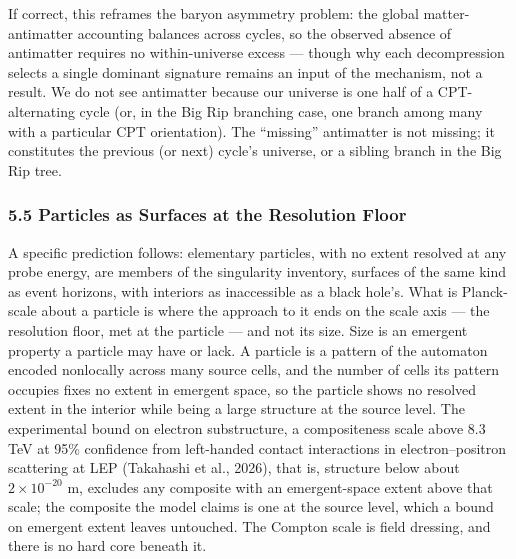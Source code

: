\documentclass[
]{article}
\begin{document}
If correct, this reframes the baryon asymmetry problem: the global
matter-antimatter accounting balances across cycles, so the observed
absence of antimatter requires no within-universe excess --- though why
each decompression selects a single dominant signature remains an input
of the mechanism, not a result. We do not see antimatter because our
universe is one half of a CPT-alternating cycle (or, in the Big Rip
branching case, one branch among many with a particular CPT
orientation). The ``missing'' antimatter is not missing; it constitutes
the previous (or next) cycle's universe, or a sibling branch in the Big
Rip tree.

\hypertarget{particles-as-surfaces-at-the-resolution-floor}{%
\subsubsection{5.5 Particles as Surfaces at the Resolution
Floor}\label{particles-as-surfaces-at-the-resolution-floor}}

A specific prediction follows: elementary particles, with no extent
resolved at any probe energy, are members of the singularity inventory,
surfaces of the same kind as event horizons, with interiors as
inaccessible as a black hole's. What is Planck-scale about a particle is
where the approach to it ends on the scale axis --- the resolution
floor, met at the particle --- and not its size. Size is an emergent
property a particle may have or lack. A particle is a pattern of the
automaton encoded nonlocally across many source cells, and the number of
cells its pattern occupies fixes no extent in emergent space, so the
particle shows no resolved extent in the interior while being a large
structure at the source level. The experimental bound on electron
substructure, a compositeness scale above 8.3 TeV at 95\% confidence
from left-handed contact interactions in electron--positron scattering
at LEP (Takahashi et al., 2026), that is, structure below about
\(2 \times 10^{-20}\) m, excludes any composite with an emergent-space
extent above that scale; the composite the model claims is one at the
source level, which a bound on emergent extent leaves untouched. The
Compton scale is field dressing, and there is no hard core beneath it.
\end{document}
